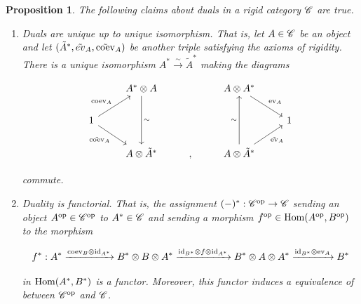 \documentclass{article}
\newtheorem{proposition}{Proposition}[section]
\theoremstyle{definition}
\numberwithin{figure}{section}
\begin{document}
\begin{proposition}\label{rigidity} The following claims about duals in a rigid category $\mathscr{C}$ are true.

\begin{enumerate}
\item Duals are unique up to unique isomorphism. That is, let $A\in \mathscr{C}$ be an object and let $(\tilde{A}^{*},\tilde{ev}_A,\tilde{\mathrm{coev}}_A)$ be another triple satisfying the axioms of rigidity. There is a unique isomorphism $A^{*}\xrightarrow{\sim}\tilde{A}^{*}$ making the diagrams

\[\begin{tikzcd}
	& {A^{*}\otimes A} && {A\otimes A^{*}} \\
	1 &&&& 1 \\
	& {A\otimes \tilde{A}^*} & {,} & {A\otimes \tilde{A}^{*}}
	\arrow["{\coev_A}", from=2-1, to=1-2]
	\arrow["{\tilde{\coev}_A}"', from=2-1, to=3-2]
	\arrow["\sim", from=1-2, to=3-2]
	\arrow["\sim", from=3-4, to=1-4]
	\arrow["{\ev_A}", from=1-4, to=2-5]
	\arrow["{\tilde{\ev}_A}"', from=3-4, to=2-5]
\end{tikzcd}\]

commute.

\item Duality is functorial. That is, the assignment $(\--)^{*}:\mathscr{C}^{\mathrm{op}}\to \mathscr{C}$ sending an object $A^{\mathrm{op}}\in \mathscr{C}^{\mathrm{op}}$ to $A^{*}\in \mathscr{C}$ and sending a morphism $f^{\mathrm{op}}\in \mathrm{Hom}(A^{\mathrm{op}},B^{\mathrm{op}})$ to the morphism

$$f^*:A^*\xrightarrow{\mathrm{coev}_B\otimes \mathrm{id}_{A^*}} B^*\otimes B\otimes A^*\xrightarrow{\mathrm{id}_{B^*}\otimes f\otimes \mathrm{id}_{A^*}} B^*\otimes A\otimes A^* \xrightarrow{\mathrm{id}_{B^*}\otimes \mathrm{ev}_A} B^*$$

in $\mathrm{Hom}(A^{*},B^{*})$ is a functor. Moreover, this functor induces a equivalence of between $\mathscr{C}^{\mathrm{op}}$ and $\mathscr{C}$.
\end{enumerate}
\end{proposition}
\end{document}

